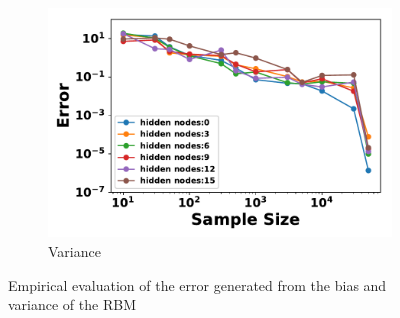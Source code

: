 \documentclass[letterpaper]{article} %
\begin{document}
\begin{figure}[t]
\begin{subfigure}[b]{0.33\textwidth}
              \includegraphics[width=\textwidth]{./RBM_Variance_Selected-eps-converted-to.pdf}
              \caption{Variance}
          \end{subfigure}
          \caption{Empirical evaluation of the error generated from the bias and variance of the RBM} \label{fig:RBM_error_plot}
        \end{figure}
        
\end{document}
